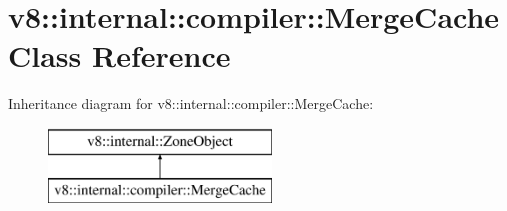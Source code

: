 \hypertarget{classv8_1_1internal_1_1compiler_1_1_merge_cache}{}\section{v8\+:\+:internal\+:\+:compiler\+:\+:Merge\+Cache Class Reference}
\label{classv8_1_1internal_1_1compiler_1_1_merge_cache}
Inheritance diagram for v8\+:\+:internal\+:\+:compiler\+:\+:Merge\+Cache\+:\begin{figure}[H]
\begin{center}
\leavevmode
\includegraphics[height=2.000000cm]{classv8_1_1internal_1_1compiler_1_1_merge_cache}
\end{center}
\end{figure}
